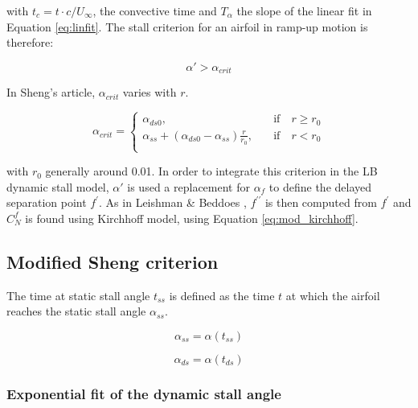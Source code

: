 \noindent with $t_c=t \cdot c/U_{\infty}$, the convective time and $T_\alpha$ the slope of the linear fit in Equation \ref{eq:linfit}. The stall criterion for an airfoil in ramp-up motion is therefore: 

\begin{equation}
\alpha' > \alpha_{crit}
\label{eq:stall_criterion}
\end{equation}

In Sheng's article, $\alpha_{crit}$ varies with $r$. 

\begin{equation}
\alpha_{crit} =
\begin{cases}
\alpha_{ds0}, &\quad \text{if} \quad r \geq r_0 \\
\alpha_{ss} + (\alpha_{ds0}-\alpha_{ss}) \frac{r}{r_0}, &\quad \text{if} \quad r < r_0 \\
\end{cases}
\label{eq:alpha_crit}
\end{equation}

\noindent with $r_0$ generally around 0.01. In order to integrate this criterion in the LB dynamic stall model, $\alpha'$ is used a replacement for $\alpha_f$ to define the delayed separation point $f^{\prime}$. As in Leishman \& Beddoes \cite{leishman_semi-empirical_1989}, $f^{\prime \prime}$ is then computed from $f^{\prime}$ and $C_N^f$ is found using Kirchhoff model, using Equation \eqref{eq:mod_kirchhoff}. 

\subsection{Modified Sheng criterion}
\label{section:expfit}


The time at static stall angle $t_{ss}$ is defined as the time $t$ at which the airfoil reaches the static stall angle $\alpha_{ss}$.

\begin{equation}
\alpha_{ss} = \alpha(t_{ss})
\end{equation}

\begin{equation}
	\alpha_{ds} = \alpha(t_{ds})
\end{equation}

\subsubsection{Exponential fit of the dynamic stall angle}

